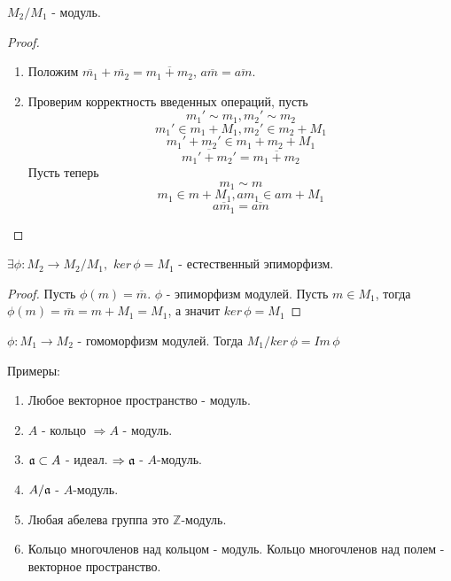 \begin{thm}
  $ M_2/M_1 $ - модуль. 
\end{thm}

\begin{proof}
  \begin{enumerate}
    \item Положим $ \overline{m_1} + \overline{m_2} = \overline{m_1 + m_2} $, $ a\overline{m} = \overline{am} $.
    \item Проверим корректность введенных операций, пусть 
      \[ m_1' \sim m_1, m_2' \sim m_2 \]
      \[ m_1' \in m_1 + M_1, m_2' \in m_2 + M_1 \]
      \[ m_1' + m_2' \in m_1 + m_2 + M_1 \]
      \[ \overline{m_1' + m_2'} = \overline{m_1 + m_2} \]
      Пусть теперь 
      \[ m_1 \sim m \]
      \[ m_1 \in m + M_1, am_1 \in am + M_1 \]
      \[ \overline{am_1} = \overline{am} \]
  \end{enumerate}
\end{proof}

\begin{thm}
  $ \exists \phi : M_2 \rightarrow M_2/M_1, $ $ ker \, \phi = M_1 $ - естественный эпиморфизм.
\end{thm}

\begin{proof}
  Пусть $ \phi(m) = \overline{m} $. $\phi $ - эпиморфизм модулей. Пусть $ m \in M_1 $, тогда
  $ \phi(m) = \overline{m} = m + M_1 = M_1 $, а значит $ ker \, \phi = M_1 $
\end{proof}

\begin{thm}
  $ \phi : M_1 \rightarrow M_2 $ - гомоморфизм модулей. Тогда $ M_1/ker \, \phi = Im \, \phi $
\end{thm}

Примеры:
\begin{enumerate}
  \item Любое векторное пространство - модуль.
  \item $ A $ - кольцо $ \Rightarrow A $ - модуль.
  \item $ \mathfrak{a} \subset A $ - идеал. $ \Rightarrow \mathfrak{a} $ - $A$-модуль. 
  \item $ A / \mathfrak{a} $ - $A$-модуль.
  \item Любая абелева группа это $ \mathbb{Z}$-модуль.
  \item Кольцо многочленов над кольцом - модуль. Кольцо многочленов над полем - векторное пространство.
\end{enumerate}
